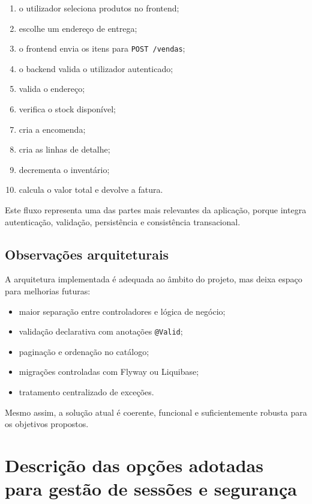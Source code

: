 \documentclass[10pt,a4paper]{report}
\begin{document}
\begin{enumerate}
    \item o utilizador seleciona produtos no frontend;
    \item escolhe um endereço de entrega;
    \item o frontend envia os itens para \texttt{POST /vendas};
    \item o backend valida o utilizador autenticado;
    \item valida o endereço;
    \item verifica o stock disponível;
    \item cria a encomenda;
    \item cria as linhas de detalhe;
    \item decrementa o inventário;
    \item calcula o valor total e devolve a fatura.
\end{enumerate}

Este fluxo representa uma das partes mais relevantes da aplicação, porque integra autenticação, validação, persistência e consistência transacional.

\section{Observações arquiteturais}

A arquitetura implementada é adequada ao âmbito do projeto, mas deixa espaço para melhorias futuras:

\begin{itemize}
    \item maior separação entre controladores e lógica de negócio;
    \item validação declarativa com anotações \texttt{@Valid};
    \item paginação e ordenação no catálogo;
    \item migrações controladas com Flyway ou Liquibase;
    \item tratamento centralizado de exceções.
\end{itemize}

Mesmo assim, a solução atual é coerente, funcional e suficientemente robusta para os objetivos propostos.

\chapter{Descrição das opções adotadas para gestão de sessões e segurança}
\label{chap:seguranca}
\end{document}

